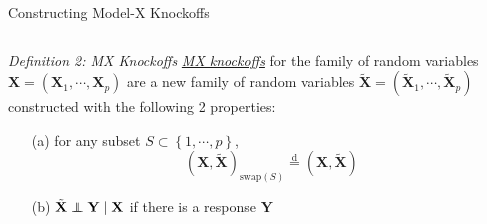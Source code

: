     \begin{frame}{Constructing Model-X Knockoffs}
        \begin{columns}
            \begin{column}{0.95\textwidth}
                {\scriptsize
                \begin{block}{\textit{Definition 2: MX Knockoffs}}
                    \underline{\textit{MX knockoffs}} for the family of random variables $\mathbf{X}=(\mathbf{X}_1,\cdots,\mathbf{X}_p)$ are a new family of random variables $\tilde{\mathbf{X}} = (\tilde{\mathbf{X}}_1,\cdots,\tilde{\mathbf{X}}_p)$ constructed with the following 2 properties:
                    \begin{itemize}
                        \item[(a)] for any subset $S \subset \left\{1,\cdots,p \right\}$, $$ (\mathbf{X},\tilde{\mathbf{X}})_{\mathrm{swap}(S)} \overset{\mathrm{d}}{=}(\mathbf{X},\tilde{\mathbf{X}}) $$
                        \item[(b)] $\tilde{\mathbf{X}}\perp\!\!\!\!\perp \mathbf{Y}\mid \mathbf{X}$ if there is a response $\mathbf{Y}$
                    \end{itemize}
                \end{block}}
                \vspace*{5pt}
                \vspace*{3pt}
            \end{column}
        \end{columns}
    \end{frame}

